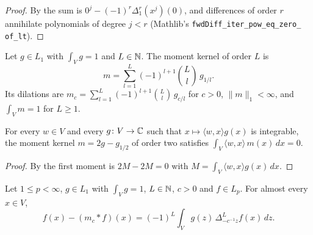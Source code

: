 \begin{proof}
\leanok
By  the sum is $0^j - (-1)^r \Delta^r_1 (x^j)(0)$, and differences
of order $r$ annihilate polynomials of degree $j < r$ (Mathlib's
\texttt{fwdDiff\_\allowbreak iter\_\allowbreak pow\_\allowbreak eq\_\allowbreak zero\_\allowbreak
of\_\allowbreak lt}).
\end{proof}

\begin{definition}
\label{def:moment-kernel}
\leanok
{}
Let $g \in L_1$ with $\int_V g = 1$ and $L \in \mathbb{N}$. The moment kernel of order $L$ is
\[
  m = \sum_{l=1}^L (-1)^{l+1} \binom{L}{l} \, g_{1/l} .
\]
Its dilations are $m_c = \sum_{l=1}^L (-1)^{l+1} \binom{L}{l} \, g_{c/l}$ for $c > 0$,
$\|m\|_1 < \infty$, and $\int_V m = 1$ for $L \geq 1$.
\end{definition}

\begin{lemma}
\label{lem:moment-kernel-first-moment}
\leanok
{}
For every $w \in V$ and every $g \colon V \to \mathbb{C}$ such that $x \mapsto \langle w, x \rangle g(x)$
is integrable, the moment kernel $m = 2 g - g_{1/2}$ of order two satisfies
$\int_V \langle w, x \rangle \, m(x) \, dx = 0$.
\end{lemma}

\begin{proof}
\leanok
By  the first moment is $2 M - 2 M = 0$ with
$M = \int_V \langle w, x \rangle g(x) \, dx$.
\end{proof}

\begin{lemma}
\label{lem:averaged-differences}
\leanok
{}
Let $1 \leq p < \infty$, $g \in L_1$ with $\int_V g = 1$, $L \in \mathbb{N}$, $c > 0$ and $f \in L_p$.
For almost every $x \in V$,
\[
  f(x) - (m_c * f)(x) = (-1)^L \int_V g(z) \, \Delta^L_{-c^{-1} z} f(x) \, dz .
\]
\end{lemma}

